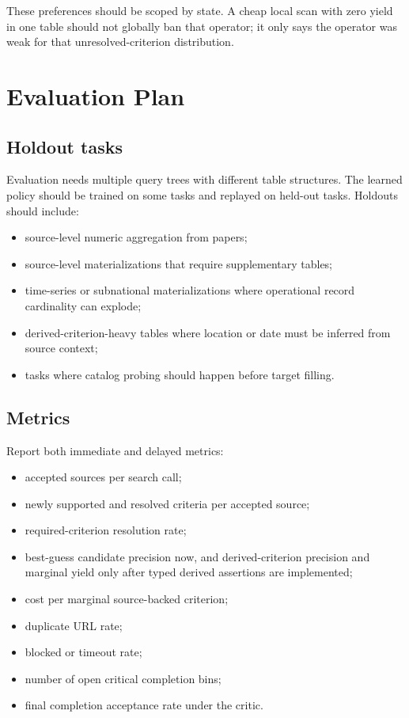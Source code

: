 \documentclass[11pt]{article}
\begin{document}
These preferences should be scoped by state.  A cheap local scan with zero
yield in one table should not globally ban that operator; it only says the
operator was weak for that unresolved-criterion distribution.

\section{Evaluation Plan}

\subsection{Holdout tasks}

Evaluation needs multiple query trees with different table structures.  The
learned policy should be trained on some tasks and replayed on held-out tasks.
Holdouts should include:

\begin{itemize}
  \item source-level numeric aggregation from papers;
  \item source-level materializations that require supplementary tables;
  \item time-series or subnational materializations where operational record
  cardinality can explode;
  \item derived-criterion-heavy tables where location or date must be inferred
  from source context;
  \item tasks where catalog probing should happen before target filling.
\end{itemize}

\subsection{Metrics}

Report both immediate and delayed metrics:

\begin{itemize}
  \item accepted sources per search call;
  \item newly supported and resolved criteria per accepted source;
  \item required-criterion resolution rate;
  \item best-guess candidate precision now, and derived-criterion precision and
  marginal yield only after typed derived assertions are implemented;
  \item cost per marginal source-backed criterion;
  \item duplicate URL rate;
  \item blocked or timeout rate;
  \item number of open critical completion bins;
  \item final completion acceptance rate under the critic.
\end{itemize}
\end{document}
